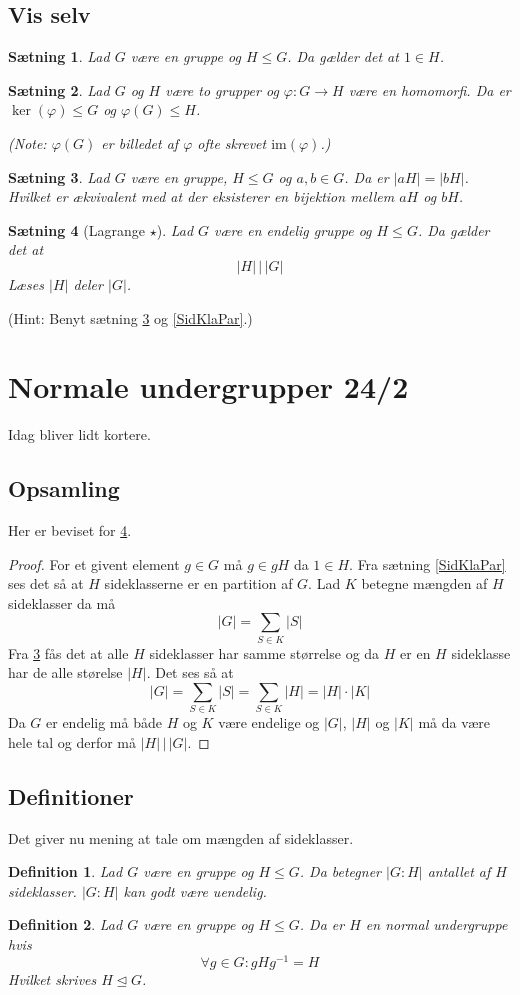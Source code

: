 \documentclass{article}
\newcommand{\inv}{^{-1}}
\newcommand{\too}{\rightarrow}
\newtheorem{setn}{Sætning}
\newtheorem{defi}{Definition}
\begin{document}
		\subsection*{Vis selv}
		\begin{setn}
			Lad $G$ være en gruppe og $H \le G$. Da gælder det at $1 \in H$.
		\end{setn}
		\begin{setn}
			Lad $G$ og $H$ være to grupper og $\varphi: G \too H$ være en homomorfi.
			Da er $\ker(\varphi) \le G$ og $\varphi(G) \le H$.
			
			(Note: $\varphi(G)$ er billedet af $\varphi$ ofte skrevet $\text{im}(\varphi)$.)
		\end{setn}
		\begin{setn} \label{SidKlaStø}
			Lad $G$ være en gruppe, $H \le G$ og $a,b \in G$. Da er $|aH| = |bH|$.
			Hvilket er ækvivalent med at der eksisterer en bijektion mellem $aH$ og $bH$.
		\end{setn}
		\begin{setn}[Lagrange $\star$] \label{Lagrange}
			Lad $G$ være en endelig gruppe og $H \le G$. Da gælder det at
			$$|H| \,\Big|\, |G|$$
			Læses $|H|$ deler $|G|$.
		\end{setn}
		(Hint: Benyt sætning \ref{SidKlaStø} og \ref{SidKlaPar}.)
	\newpage
	\section*{Normale undergrupper 24/2}
		Idag bliver lidt kortere.
		\subsection*{Opsamling}
		Her er beviset for \ref{Lagrange}.
		\begin{proof}
			For et givent element $g \in G$ må $g \in gH$ da $1 \in H$.
			Fra sætning \ref{SidKlaPar} ses det så at $H$ sideklasserne
			er en partition af $G$. Lad $K$ betegne mængden af $H$ sideklasser da må
			$$|G| = \sum_{S \in K} |S|$$
			Fra \ref{SidKlaStø} fås det at alle $H$ sideklasser har samme størrelse og
			da $H$ er en $H$ sideklasse har de alle størelse $|H|$. Det ses så at
			$$|G| = \sum_{S \in K} |S| = \sum_{S \in K} |H| = |H|\cdot |K|$$
			Da $G$ er endelig må både $H$ og $K$ være endelige og $|G|$, $|H|$ og $|K|$
			må da være hele tal og derfor må $|H| \,\Big|\, |G|$.
		\end{proof}
		\subsection*{Definitioner}
		Det giver nu mening at tale om mængden af sideklasser.
		\begin{defi}
			Lad $G$ være en gruppe og $H \le G$. Da betegner $|G:H|$
			antallet af $H$ sideklasser. $|G:H|$ kan godt være uendelig.
		\end{defi}
		\begin{defi}
			Lad $G$ være en gruppe og $H \le G$. Da er $H$ en normal undergruppe hvis
			$$\forall g \in G: gHg\inv = H$$
			Hvilket skrives $H \unlhd G$.
		\end{defi}
\end{document}
